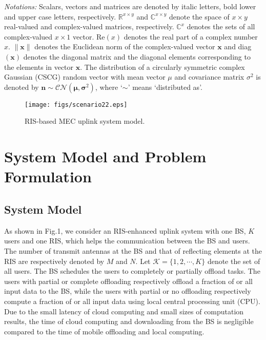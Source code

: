 \documentclass[journal]{IEEEtran}
\begin{document}
\textit{Notations:} Scalars, vectors and matrices are denoted by italic letters, bold lower and upper case letters, respectively. $\mathbb R^{x \times y}$ and $\mathbb C^{x \times y}$ denote the space of $x \times y$ real-valued and complex-valued matrices, respectively. $\mathbb C^x$ denotes the sets of all complex-valued $x \times 1$ vector. $\text {Re}(x)$ denotes the real part of a complex number $x$. $\|\pmb x\|$ denotes the Euclidean norm of the complex-valued vector $\pmb x$ and diag$(\pmb x)$ denotes the diagonal matrix and the diagonal elements corresponding to the elements in vector $\pmb x$. The distribution of a circularly symmetric complex Gaussian (CSCG) random vector with mean vector $\mu$ and covariance matrix $\sigma^2$ is denoted by $\pmb n \sim \mathcal C \mathcal N(\pmb \mu, \pmb \sigma^2)$, where `$\sim$' means `distributed as'.
\begin{figure}[htb]
	\centering
	\texttt{[image: figs/scenario22.eps]}
	\vspace{-1.5em}
	\caption{RIS-based MEC uplink system model.}\label{fig1}
	\vspace{-.5em}
\end{figure}

\section{System Model and Problem Formulation}
\subsection{System Model}
As shown in Fig.1, we consider an RIS-enhanced uplink system with one BS, $K$ users and one RIS, which helps the communication between the BS and users.
The number of transmit antennas at the BS and that of reflecting elements at the RIS are respectively denoted by $M$ and $N$.
Let $\mathcal K=\{1, 2, \cdots, K\}$ denote the set of all users.
The BS schedules the users to completely or partially offload tasks.
The users with partial or complete offloading respectively offload a fraction of or all input data to the BS, while the users with partial or no offloading respectively compute a fraction of or all input data using local central processing unit (CPU).
Due to the small latency of cloud computing and small sizes of computation results, the time of cloud computing and downloading from the BS is negligible compared to the time of mobile offloading and local computing.
\end{document}

